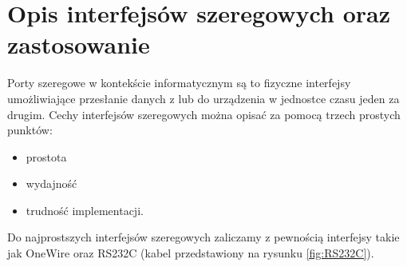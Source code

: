 \documentclass{BscUS}
\begin{document}
\section{Opis interfejsów szeregowych oraz zastosowanie}
\label{s:serialInterface}
\indent Porty szeregowe w kontekście informatycznym są to fizyczne interfejsy umożliwiające przesłanie danych z lub do urządzenia w jednostce czasu jeden za drugim. Cechy interfejsów szeregowych można opisać za pomocą trzech prostych punktów:
\begin{itemize}
\item prostota
\item wydajność
\item trudność implementacji.
\end{itemize}
Do najprostszych interfejsów szeregowych zaliczamy z pewnością interfejsy takie jak OneWire oraz RS232C (kabel przedstawiony na rysunku \ref{fig:RS232C}).
\end{document}
